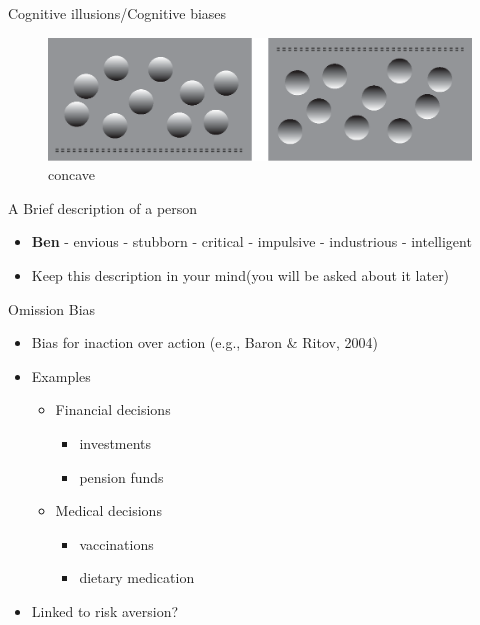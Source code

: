 \documentclass[
  ignorenonframetext,
]{beamer}
\providecommand{\tightlist}{%
  \setlength{\itemsep}{0pt}\setlength{\parskip}{0pt}}\usepackage{longtable,booktabs,array}
\begin{document}
\begin{frame}{Cognitive illusions/Cognitive biases}
\protect\hypertarget{cognitive-illusionscognitive-biases}{}
\begin{figure}

{\centering \includegraphics{resources/images/bothconcaveconvex.png}

}

\caption{concave}

\end{figure}
\end{frame}

\begin{frame}{A Brief description of a person}
\protect\hypertarget{a-brief-description-of-a-person-1}{}
\begin{itemize}
\tightlist
\item
  \textbf{Ben} - envious - stubborn - critical - impulsive - industrious
  - intelligent
\end{itemize}

\begin{itemize}
\tightlist
\item
  Keep this description in your mind(you will be asked about it later)
\end{itemize}
\end{frame}

\begin{frame}{Omission Bias}
\protect\hypertarget{omission-bias}{}
\begin{itemize}[<+->]
\item
  Bias for inaction over action (e.g., Baron \& Ritov, 2004)
\item
  Examples

  \begin{itemize}[<+->]
  \tightlist
  \item
    Financial decisions

    \begin{itemize}[<+->]
    \tightlist
    \item
      investments
    \item
      pension funds
    \end{itemize}
  \item
    Medical decisions

    \begin{itemize}[<+->]
    \tightlist
    \item
      vaccinations
    \item
      dietary medication
    \end{itemize}
  \end{itemize}
\item
  Linked to risk aversion?
\end{itemize}
\end{frame}
\end{document}
